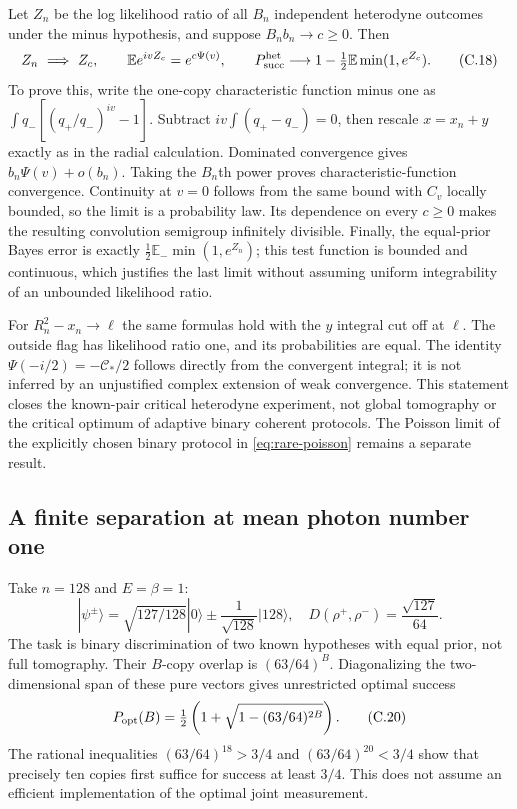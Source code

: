 \documentclass[11pt,a4paper]{article}
\numberwithin{equation}{section}
\begin{document}
Let $Z_n$ be the log likelihood ratio of all $B_n$ independent heterodyne
outcomes under the minus hypothesis, and suppose $B_nb_n\to c\ge0$.
Then
\[
 Z_n\ \Longrightarrow\ Z_c,\qquad
 \mathbb E e^{ivZ_c}=e^{c\Psi(v)},\qquad
 P_{\rm succ}^{\rm het}\longrightarrow
     1-\tfrac12\mathbb E\min(1,e^{Z_c}).
 \tag{C.18}\label{eq:rare-critical-experiment}
\]
To prove this, write the one-copy characteristic function minus one as
$\int q_-[(q_+/q_-)^{iv}-1]$. Subtract
$iv\int(q_+-q_-)=0$, then rescale $x=x_n+y$ exactly as in the radial
calculation. Dominated convergence gives $b_n\Psi(v)+o(b_n)$. Taking the
$B_n$th power proves characteristic-function convergence. Continuity at
$v=0$ follows from the same bound with $C_v$ locally bounded, so the limit
is a probability law. Its dependence on every $c\ge0$ makes the resulting
convolution semigroup infinitely divisible. Finally, the equal-prior Bayes
error is exactly $\tfrac12\mathbb E_-\min(1,e^{Z_n})$; this test function is
bounded and continuous, which justifies the last limit without assuming
uniform integrability of an unbounded likelihood ratio.

For $R_n^2-x_n\to\ell$ the same formulas hold with the $y$ integral cut off
at $\ell$. The outside flag has likelihood ratio one, and its probabilities
are equal. The identity $\Psi(-i/2)=-\mathcal C_*/2$ follows directly from
the convergent integral; it is not inferred by an unjustified complex
extension of weak convergence. This statement closes the known-pair critical
heterodyne experiment, not global tomography or the critical optimum of
adaptive binary coherent protocols. The Poisson limit of the explicitly
chosen binary protocol in \eqref{eq:rare-poisson} remains a separate result.

\subsection{A finite separation at mean photon number one}
Take $n=128$ and $E=\beta=1$:
\[
 |\psi^\pm\rangle=\sqrt{127/128}|0\rangle
                \pm\frac1{\sqrt{128}}|128\rangle,
 \quad D(\rho^+,\rho^-)=\frac{\sqrt{127}}{64}.
 \tag{C.19}\label{eq:rare-128}
\]
The task is binary discrimination of two known hypotheses with equal prior,
not full tomography. Their $B$-copy overlap is $(63/64)^B$.
Diagonalizing the two-dimensional span of these pure vectors gives
unrestricted optimal success
\[
 P_{\rm opt}(B)=\tfrac12\left(1+\sqrt{1-(63/64)^{2B}}\right).
 \tag{C.20}\label{eq:rare-helstrom}
\]
The rational inequalities $(63/64)^{18}>3/4$ and
$(63/64)^{20}<3/4$ show that precisely ten copies first suffice for success
at least $3/4$. This does not assume an efficient implementation of the
optimal joint measurement.
\end{document}
